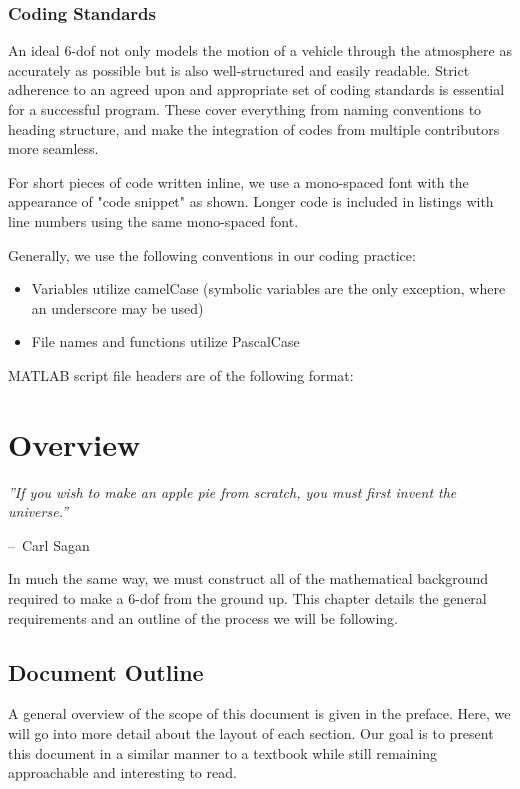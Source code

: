 \documentclass[12pt]{report}
\makeatletter
\newenvironment{chapquote}[2][2em]
  {\setlength{\@tempdima}{#1}%
   \def\chapquote@author{#2}%
   \parshape 1 \@tempdima \dimexpr\textwidth-2\@tempdima\relax%
   \itshape}
  {\par\normalfont\hfill--\ \chapquote@author\hspace*{\@tempdima}\par\bigskip}
\makeatother
\begin{document}
\subsection*{Coding Standards}
An ideal 6-\gls{dof} not only models the motion of a vehicle through the atmosphere as accurately as possible but is also well-structured and easily readable. Strict adherence to an agreed upon and appropriate set of coding standards is essential for a successful program. These cover everything from naming conventions to heading structure, and make the integration of codes from multiple contributors more seamless.

For short pieces of code written inline, we use a mono-spaced font with the appearance of "code snippet" as shown. Longer code is included in listings with line numbers using the same mono-spaced font.

Generally, we use the following conventions in our coding practice:
\begin{itemize}
    \item Variables utilize camelCase (symbolic variables are the only exception, where an underscore may be used)
    \item File names and functions utilize PascalCase


\end{itemize}
MATLAB script file headers are of the following format:


\chapter{Overview}


\begin{chapquote}{Carl Sagan}
''If you wish to make an apple pie from scratch, you must first invent the universe.''
\end{chapquote}

In much the same way, we must construct all of the mathematical background required to make a 6-\gls{dof} from the ground up. This chapter details the general requirements and an outline of the process we will be following.

\section{Document Outline}
A general overview of the scope of this document is given in the preface.  Here, we will go into more detail about the layout of each section. Our goal is to present this document in a similar manner to a textbook while still remaining approachable and interesting to read.
\end{document}
